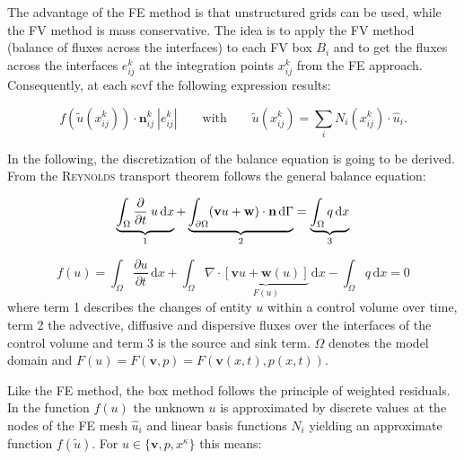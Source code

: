 The advantage of the FE method is that unstructured grids can be used, while the
FV method is mass conservative. The idea is to apply the FV method (balance of
fluxes across the interfaces) to each FV box $B_i$  and to get the fluxes across
the interfaces $e^k_{ij}$ at the integration points $x^k_{ij}$ from the FE approach.
Consequently, at each scvf the following expression results:

\begin{equation}
 	f(\tilde u(x^k_{ij})) \cdot \mathbf n^k_{ij} \: |e^k_{ij}| \qquad \textrm{with}
 	\qquad \tilde u(x^k_{ij}) = \sum_i N_i(x^k_{ij}) \cdot \hat u_i .
\end{equation}

In the following, the discretization of the balance equation is going to be derived.
From the \textsc{Reynolds} transport theorem follows the general balance equation:

\begin{equation}
	\underbrace{\int_\Omega \frac{\partial}{\partial t} \: u \, \mathrm{d}x}_{1}
	+ \underbrace{\int_{\partial\Omega} (\mathbf{v} u + \mathbf w) \cdot \textbf n \, \mathrm{d}\Gamma}_{2} = \underbrace{\int_\Omega q \, \mathrm{d}x}_{3}
\end{equation}

\begin{equation}
	f(u) = \int_\Omega \frac{\partial u}{\partial t} \, \mathrm{d}x + \int_{\Omega} \nabla \cdot
	\underbrace{\left[  \mathbf{v} u + \mathbf w(u)\right] }_{F(u)}  \, \mathrm{d}x - \int_\Omega q \, \mathrm{d}x = 0
\end{equation}
where term 1 describes the changes of entity $u$ within a control volume over
time, term 2 the advective, diffusive and dispersive fluxes over the interfaces
of the control volume and term 3 is the source and sink term. $\Omega$ denotes the
model domain and $F(u) = F(\mathbf v, p) = F(\mathbf v(x,t), p(x,t))$.

Like the FE method, the box method follows the principle of weighted residuals.
In the function $f(u)$ the unknown $u$ is approximated by discrete values at the
nodes of the FE mesh $\hat u_i$ and linear basis functions $N_i$ yielding an
approximate function $f(\tilde u)$. For $u\in \lbrace \mathbf v, p, x^\kappa \rbrace$
this means:

